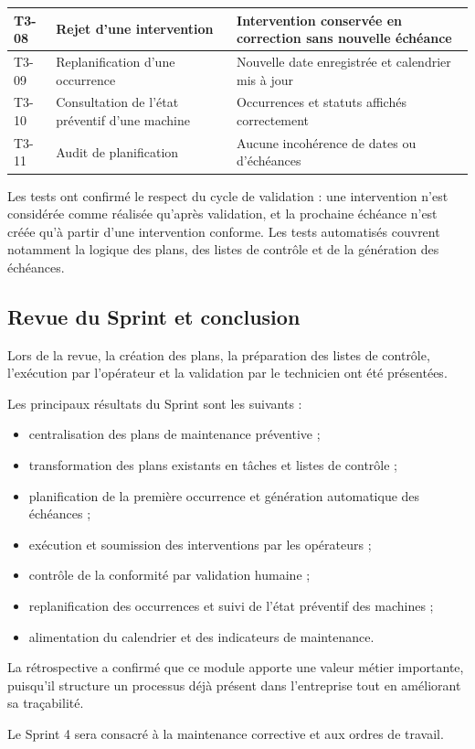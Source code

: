 {\begin{longtable}{|p{0.9cm}|>{\raggedright\arraybackslash}p{7cm}|>{\raggedright\arraybackslash}p{4.7cm}|}
T3-08 &
Rejet d'une intervention &
Intervention conservée en correction sans nouvelle échéance \\
\hline

T3-09 &
Replanification d'une occurrence &
Nouvelle date enregistrée et calendrier mis à jour \\
\hline

T3-10 &
Consultation de l'état préventif d'une machine &
Occurrences et statuts affichés correctement \\
\hline

T3-11 &
Audit de planification &
Aucune incohérence de dates ou d'échéances \\
\hline

\end{longtable}}

Les tests ont confirmé le respect du cycle de validation : une intervention n'est considérée comme réalisée qu'après validation, et la prochaine échéance n'est créée qu'à partir d'une intervention conforme. Les tests automatisés couvrent notamment la logique des plans, des listes de contrôle et de la génération des échéances.

\subsection{Revue du Sprint et conclusion}

Lors de la revue, la création des plans, la préparation des listes de contrôle, l'exécution par l'opérateur et la validation par le technicien ont été présentées.

Les principaux résultats du Sprint sont les suivants :

\begin{itemize}
    \item centralisation des plans de maintenance préventive ;
    \item transformation des plans existants en tâches et listes de contrôle ;
    \item planification de la première occurrence et génération automatique des échéances ;
    \item exécution et soumission des interventions par les opérateurs ;
    \item contrôle de la conformité par validation humaine ;
    \item replanification des occurrences et suivi de l'état préventif des machines ;
    \item alimentation du calendrier et des indicateurs de maintenance.
\end{itemize}

La rétrospective a confirmé que ce module apporte une valeur métier importante, puisqu'il structure un processus déjà présent dans l'entreprise tout en améliorant sa traçabilité.

Le Sprint 4 sera consacré à la maintenance corrective et aux ordres de travail.
